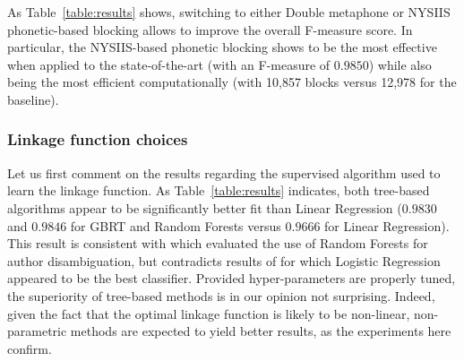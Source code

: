 \documentclass[runningheads,a4paper]{llncs}
\begin{document}
As Table~\ref{table:results} shows, switching to either Double metaphone or NYSIIS phonetic-based blocking allows
to improve the overall F-measure score.
In particular, the NYSIIS-based phonetic blocking shows to be the most effective when applied
to the state-of-the-art (with an F-measure of $0.9850$) while also being the most
efficient computationally (with 10,857 blocks versus 12,978 for the baseline).



\subsubsection{Linkage function choices}
\label{choices:linkage}
Let us first comment on the results regarding the
supervised algorithm used to learn the linkage function.
As Table~\ref{table:results} indicates, both tree-based algorithms appear to be
significantly better fit than Linear Regression ($0.9830$ and $0.9846$ for GBRT
and Random Forests versus $0.9666$ for Linear Regression). This result is
consistent with \cite{treeratpituk2009disambiguating} which evaluated the use of
Random Forests for author disambiguation, but contradicts results of
\cite{levin2012citation} for which Logistic Regression appeared to be the best
classifier.
Provided hyper-parameters are properly tuned, the superiority of
tree-based methods is in our opinion not surprising.
Indeed, given the fact that the optimal linkage function is likely to be non-linear, non-parametric
methods are expected to yield better results, as the experiments here confirm.
\end{document}
